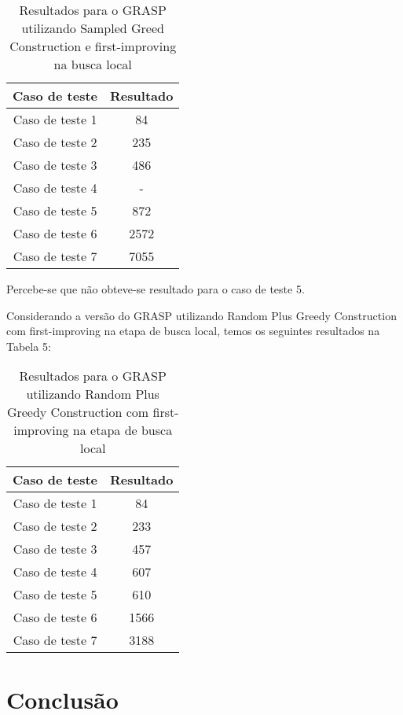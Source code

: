 \documentclass{article}
\begin{document}
\begin{table}[htbp]
\centering
\begin{tabular}{|c|c|}
\hline
\textbf{Caso de teste} & \textbf{Resultado} \\
\hline
Caso de teste 1 & 84 \\
Caso de teste 2 & 235 \\
Caso de teste 3 & 486 \\
Caso de teste 4 & - \\
Caso de teste 5 & 872 \\
Caso de teste 6 & 2572 \\
Caso de teste 7 & 7055 \\

\hline
\end{tabular}
\caption{Resultados para o GRASP utilizando Sampled Greed Construction e first-improving na busca local}
\label{tab:minha_tabela}
\end{table}

Percebe-se que não obteve-se resultado para o caso de teste 5.

Considerando a versão do GRASP utilizando Random Plus Greedy Construction com first-improving na etapa de busca local, temos os seguintes resultados na Tabela 5:

\begin{table}[htbp]
\centering
\begin{tabular}{|c|c|}
\hline
\textbf{Caso de teste} & \textbf{Resultado} \\
\hline
Caso de teste 1 & 84 \\
Caso de teste 2 & 233 \\
Caso de teste 3 & 457 \\
Caso de teste 4 & 607 \\
Caso de teste 5 & 610 \\
Caso de teste 6 & 1566 \\
Caso de teste 7 & 3188 \\

\hline
\end{tabular}
\caption{Resultados para o GRASP utilizando Random Plus Greedy Construction com first-improving na etapa de busca local}
\label{tab:minha_tabela}
\end{table}

\section{Conclusão}
\end{document}

